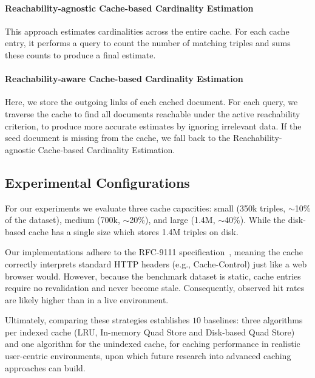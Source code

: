 \paragraph{Reachability-agnostic Cache-based Cardinality Estimation}
This approach estimates cardinalities across the entire cache.
For each cache entry, it performs a query to count the number of matching triples 
and sums these counts to produce a final estimate.

\paragraph{Reachability-aware Cache-based Cardinality Estimation}
Here, we store the outgoing links of each cached document.
For each query, we traverse the cache to find all documents reachable under the active reachability criterion,
to produce more accurate estimates by ignoring irrelevant data. 
If the seed document is missing from the cache, we fall back to the Reachability-agnostic Cache-based Cardinality Estimation.


\subsection{Experimental Configurations}
For our experiments we evaluate three cache capacities: small (350k triples, $\sim$10\% of the dataset), 
medium (700k, $\sim$20\%), and large (1.4M, $\sim$40\%). 
While the disk-based cache has a single size which stores 1.4M triples on disk.

Our implementations adhere to the RFC-9111 specification~\cite{fielding2022rfc}, 
meaning the cache correctly interprets standard HTTP headers (e.g., Cache-Control) 
just like a web browser would. 
However, because the benchmark dataset is static, cache entries require no revalidation and never become stale. 
Consequently, observed hit rates are likely higher than in a live environment. 

Ultimately, comparing these strategies establishes $10$ baselines: 
three algorithms per indexed cache (LRU, In-memory Quad Store and Disk-based Quad Store) and
one algorithm for the unindexed cache,
for caching performance in realistic user-centric environments, 
upon which future research into advanced caching approaches can build.